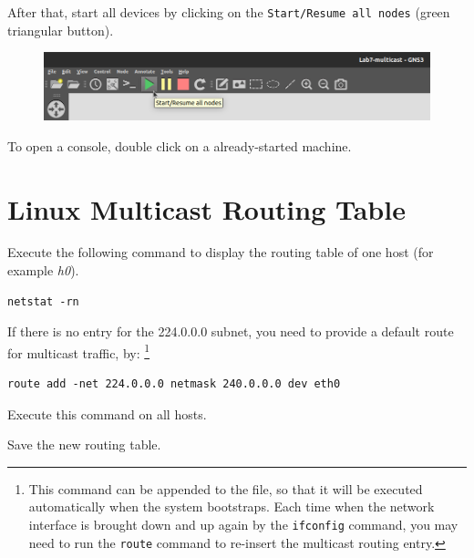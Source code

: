\documentclass{../UTNetLab}
\begin{document}
After that, start all devices by clicking on the \texttt{Start/Resume all nodes} (green triangular button).
\begin{figure}[H]
    \centering
    \includegraphics[scale=1.6]{img/start-all}
\end{figure}

To open a console, double click on a already-started machine.


\section{Linux Multicast Routing Table\label{sec:rt}}
\label{sec:linux-multicast-routing}
Execute the following command to display the routing table of one host (for example \textit{h0}).

\begin{lstlisting}
netstat -rn
    \end{lstlisting}

If there is no entry for the 224.0.0.0 subnet, you need to provide a default route for multicast traffic, by:
\footnote{This command can be appended to the  file, so that it will be executed automatically when the system bootstraps.
    Each time when the network interface is brought down and up again by the \lstinline{ifconfig} command, you may need to run the \lstinline{route} command to re-insert the multicast routing entry.}

\begin{lstlisting}[emph=eth0]
route add -net 224.0.0.0 netmask 240.0.0.0 dev eth0
    \end{lstlisting}

Execute this command on all hosts.

Save the new routing table.
\end{document}
